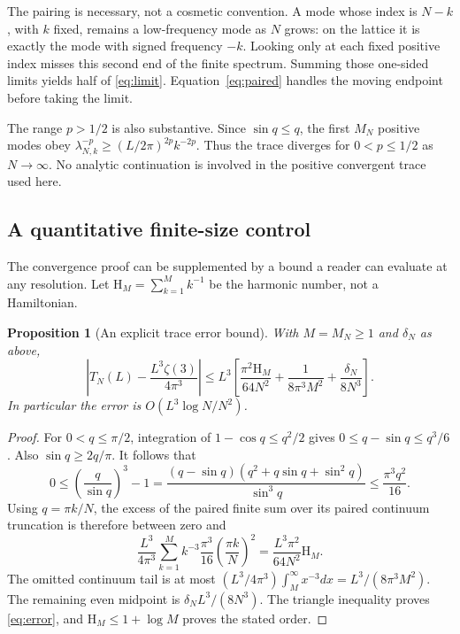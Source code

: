 \documentclass[11pt,a4paper]{article}
\newtheorem{proposition}[theorem]{Proposition}
\theoremstyle{definition}\newtheorem{definition}[theorem]{Definition}
\theoremstyle{remark}\newtheorem{remark}[theorem]{Remark}
\numberwithin{equation}{section}
\begin{document}
The pairing is necessary, not a cosmetic convention. A mode whose index is
\(N-k\), with \(k\) fixed, remains a low-frequency mode as \(N\) grows: on
the lattice it is exactly the mode with signed frequency \(-k\).
Looking only at each fixed positive index misses this second end of the
finite spectrum. Summing those one-sided limits yields half of
\eqref{eq:limit}. Equation~\eqref{eq:paired} handles the moving endpoint
before taking the limit.

The range \(p>1/2\) is also substantive. Since
\(\sin q\leq q\), the first \(M_N\) positive modes obey
\(\lambda_{N,k}^{-p}\geq(L/2\pi)^{2p}k^{-2p}\).
Thus the trace diverges for \(0<p\leq1/2\) as \(N\to\infty\).
No analytic continuation is involved in the positive convergent trace
used here.

\subsection{A quantitative finite-size control}
The convergence proof can be supplemented by a bound a reader can evaluate
at any resolution. Let \(\mathrm H_M=\sum_{k=1}^M k^{-1}\) be the harmonic
number, not a Hamiltonian.

\begin{proposition}[An explicit trace error bound]\label{prop:error}
With \(M=M_N\geq1\) and \(\delta_N\) as above,
\begin{equation}
 \left|T_N(L)-\frac{L^3\zeta(3)}{4\pi^3}\right|
 \leq L^3\left[
 \frac{\pi^2\mathrm H_M}{64N^2}
 +\frac{1}{8\pi^3M^2}+\frac{\delta_N}{8N^3}\right].
 \label{eq:error}
\end{equation}
In particular the error is \(O(L^3\log N/N^2)\).
\end{proposition}
\begin{proof}
For \(0<q\leq\pi/2\), integration of \(1-\cos q\leq q^2/2\)
gives \(0\leq q-\sin q\leq q^3/6\). Also \(\sin q\geq2q/\pi\).
It follows that
\begin{equation}
 0\leq\left(\frac q{\sin q}\right)^3-1
 =\frac{(q-\sin q)(q^2+q\sin q+\sin^2q)}{\sin^3q}
 \leq\frac{\pi^3q^2}{16}.
 \label{eq:sinbound}
\end{equation}
Using \(q=\pi k/N\), the excess of the paired finite sum over its
paired continuum truncation is therefore between zero and
\[
 \frac{L^3}{4\pi^3}
 \sum_{k=1}^M k^{-3}\frac{\pi^3}{16}
                         \left(\frac{\pi k}{N}\right)^2
 =\frac{L^3\pi^2}{64N^2}\mathrm H_M.
\]
The omitted continuum tail is at most
\((L^3/4\pi^3)\int_M^\infty x^{-3}dx=L^3/(8\pi^3M^2)\).
The remaining even midpoint is \(\delta_N L^3/(8N^3)\).
The triangle inequality proves \eqref{eq:error}, and
\(\mathrm H_M\leq1+\log M\) proves the stated order.
\end{proof}
\end{document}
